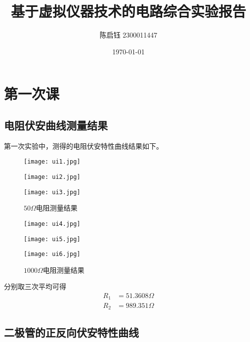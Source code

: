 \documentclass{ctexart}
\title{基于虚拟仪器技术的电路综合实验报告}
\author{陈启钰\,\,2300011447}
\date{\today}
\begin{document}
	\maketitle
	\tableofcontents
	\section{第一次课}
	\subsection{电阻伏安曲线测量结果}
	第一次实验中，测得的电阻伏安特性曲线结果如下。
	\begin{figure}[H]
		\centering
		\texttt{[image: ui1.jpg]}
	\end{figure}
	\begin{figure}[H]
		\centering
		\texttt{[image: ui2.jpg]}
	\end{figure}
	\begin{figure}[H]
		\centering
		\texttt{[image: ui3.jpg]}
		\caption{$50\Omega$电阻测量结果}
	\end{figure}
	\begin{figure}[H]
		\centering
		\texttt{[image: ui4.jpg]}
	\end{figure}
	\begin{figure}[H]
		\centering
		\texttt{[image: ui5.jpg]}
	\end{figure}
	\begin{figure}[H]
		\centering
		\texttt{[image: ui6.jpg]}
		\caption{$1000\Omega$电阻测量结果}
	\end{figure}
	分别取三次平均可得
	\begin{align}
		R_1&=51.3608\Omega\\
		R_2&=989.351\Omega
	\end{align}
	\subsection{二极管的正反向伏安特性曲线}
	
\end{document}
